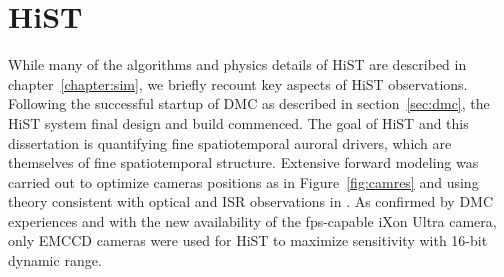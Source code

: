 \section{HiST}\label{sec:hist}
While many of the algorithms and physics details of HiST are described in chapter~\ref{chapter:sim}, we briefly recount key aspects of HiST observations.
Following the successful startup of DMC as described in section~\ref{sec:dmc}, the HiST system final design and build commenced.
The goal of HiST and this dissertation is quantifying fine spatiotemporal auroral drivers, which are themselves of fine spatiotemporal structure.
Extensive forward modeling was carried out to optimize cameras positions as in Figure~\ref{fig:camres} and using theory consistent with optical and ISR observations in \citet{akbari2013}.
As confirmed by DMC experiences and with the new availability of the \unit[50]{fps}-capable iXon Ultra camera, only EMCCD cameras were used for HiST to maximize sensitivity with 16-bit dynamic range.

